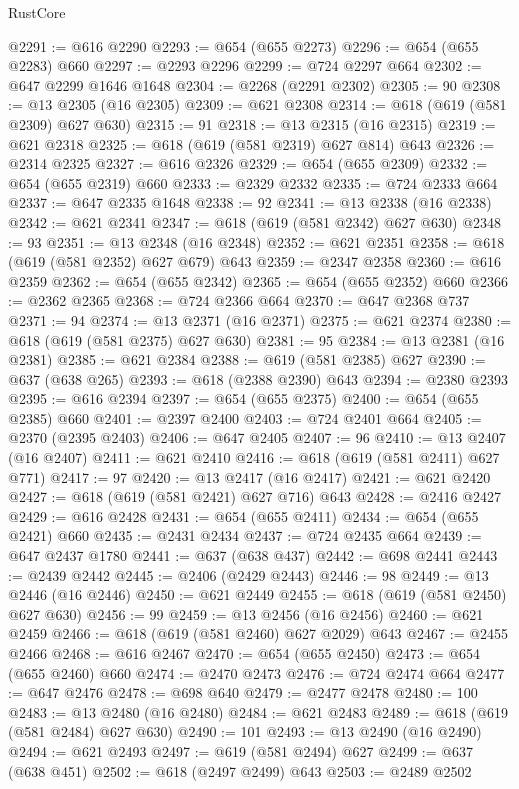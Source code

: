 \begin{lexlean}{RustCore}
\begin{coremodule}
@2291 := @616 @2290
@2293 := @654 (@655 @2273)
@2296 := @654 (@655 @2283) @660
@2297 := @2293 @2296
@2299 := @724 @2297 @664
@2302 := @647 @2299 @1646 @1648
@2304 := @2268 (@2291 @2302)
@2305 := 90
@2308 := @13 @2305 (@16 @2305)
@2309 := @621 @2308
@2314 := @618 (@619 (@581 @2309) @627 @630)
@2315 := 91
@2318 := @13 @2315 (@16 @2315)
@2319 := @621 @2318
@2325 := @618 (@619 (@581 @2319) @627 @814) @643
@2326 := @2314 @2325
@2327 := @616 @2326
@2329 := @654 (@655 @2309)
@2332 := @654 (@655 @2319) @660
@2333 := @2329 @2332
@2335 := @724 @2333 @664
@2337 := @647 @2335 @1648
@2338 := 92
@2341 := @13 @2338 (@16 @2338)
@2342 := @621 @2341
@2347 := @618 (@619 (@581 @2342) @627 @630)
@2348 := 93
@2351 := @13 @2348 (@16 @2348)
@2352 := @621 @2351
@2358 := @618 (@619 (@581 @2352) @627 @679) @643
@2359 := @2347 @2358
@2360 := @616 @2359
@2362 := @654 (@655 @2342)
@2365 := @654 (@655 @2352) @660
@2366 := @2362 @2365
@2368 := @724 @2366 @664
@2370 := @647 @2368 @737
@2371 := 94
@2374 := @13 @2371 (@16 @2371)
@2375 := @621 @2374
@2380 := @618 (@619 (@581 @2375) @627 @630)
@2381 := 95
@2384 := @13 @2381 (@16 @2381)
@2385 := @621 @2384
@2388 := @619 (@581 @2385) @627
@2390 := @637 (@638 @265)
@2393 := @618 (@2388 @2390) @643
@2394 := @2380 @2393
@2395 := @616 @2394
@2397 := @654 (@655 @2375)
@2400 := @654 (@655 @2385) @660
@2401 := @2397 @2400
@2403 := @724 @2401 @664
@2405 := @2370 (@2395 @2403)
@2406 := @647 @2405
@2407 := 96
@2410 := @13 @2407 (@16 @2407)
@2411 := @621 @2410
@2416 := @618 (@619 (@581 @2411) @627 @771)
@2417 := 97
@2420 := @13 @2417 (@16 @2417)
@2421 := @621 @2420
@2427 := @618 (@619 (@581 @2421) @627 @716) @643
@2428 := @2416 @2427
@2429 := @616 @2428
@2431 := @654 (@655 @2411)
@2434 := @654 (@655 @2421) @660
@2435 := @2431 @2434
@2437 := @724 @2435 @664
@2439 := @647 @2437 @1780
@2441 := @637 (@638 @437)
@2442 := @698 @2441
@2443 := @2439 @2442
@2445 := @2406 (@2429 @2443)
@2446 := 98
@2449 := @13 @2446 (@16 @2446)
@2450 := @621 @2449
@2455 := @618 (@619 (@581 @2450) @627 @630)
@2456 := 99
@2459 := @13 @2456 (@16 @2456)
@2460 := @621 @2459
@2466 := @618 (@619 (@581 @2460) @627 @2029) @643
@2467 := @2455 @2466
@2468 := @616 @2467
@2470 := @654 (@655 @2450)
@2473 := @654 (@655 @2460) @660
@2474 := @2470 @2473
@2476 := @724 @2474 @664
@2477 := @647 @2476
@2478 := @698 @640
@2479 := @2477 @2478
@2480 := 100
@2483 := @13 @2480 (@16 @2480)
@2484 := @621 @2483
@2489 := @618 (@619 (@581 @2484) @627 @630)
@2490 := 101
@2493 := @13 @2490 (@16 @2490)
@2494 := @621 @2493
@2497 := @619 (@581 @2494) @627
@2499 := @637 (@638 @451)
@2502 := @618 (@2497 @2499) @643
@2503 := @2489 @2502

\end{coremodule}
\end{lexlean}
